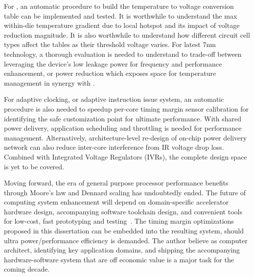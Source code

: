 For \tistates, an automatic procedure to build the temperature to voltage conversion table can be implemented and tested. It is worthwhile to understand the max within-die temperature gradient due to local hotspot and its impact of voltage reduction magnitude. It is also worthwhile to understand how different circuit cell types affect the \tistate tables as their threshold voltage varies. For latest 7nm technology, a thorough evaluation is needed to understand to trade-off between leveraging the device's low leakage power for frequency and performance enhancement, or power reduction which exposes space for temperature management in synergy with \tistates.

For adaptive clocking, or adaptive instruction issue system, an automatic procedure is also needed to speedup per-core timing margin sensor calibration for identifying the safe customization point for ultimate performance. With shared power delivery, application scheduling and throttling is needed for performance management. Alternatively, architecture-level re-design of on-chip power delivery network can also reduce inter-core interference from IR voltage drop loss. Combined with Integrated Voltage Regulators (IVRs), the complete design space is yet to be covered.

Moving forward, the era of general purpose processor performance benefits through Moore's law and Dennard scaling has undoubtedly ended. The future of computing system enhancement will depend on domain-specific accelerator hardware design, accompanying software toolchain design, and convenient tools for low-cost, fast prototyping and testing~\cite{hennessynew}. The timing margin optimizations proposed in this dissertation can be embedded into the resulting system, should ultra power/performance efficiency is demanded. The author believe as computer architect, identifying key application domains, and shipping the accompanying hardware-software system that are off economic value is a major task for the coming decade.